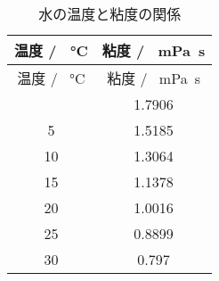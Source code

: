 \begin{longtable}{cc}
    \caption{水の温度と粘度の関係} \label{tab:water-viscosity}               \\
    \hline 温度 / \SI{}{\celsius} & 粘度 / \SI{}{\milli\pascal\second} \\ \hline
    \endfirsthead
    \hline 温度 / \SI{}{\celsius} & 粘度 / \SI{}{\milli\pascal\second} \\ \hline
    \endhead
    \hline
    \endfoot
    0                           & 1.7906                           \\
    5                           & 1.5185                           \\
    10                          & 1.3064                           \\
    15                          & 1.1378                           \\
    20                          & 1.0016                           \\
    25                          & 0.8899                           \\
    30                          & 0.797                            \\
\end{longtable}
